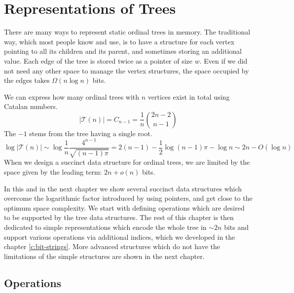 \chapter{Representations of Trees}

There are many ways to represent static ordinal trees in memory.
The traditional way, which most people know and use, is to have a structure for each vertex pointing to all its children and its parent, and sometimes storing an additional value.
Each edge of the tree is stored twice as a pointer of size $w$.
Even if we did not need any other space to manage the vertex structures, the space occupied by the edges takes $\Omega (n \log n)$ bits.

We can express how many ordinal trees with $n$ vertices exist in total using Catalan numbers.
$$ | \mathcal{T}(n) | = C_{n-1} = \frac{1}{n} {2n - 2 \choose n - 1} $$
The $-1$ stems from the tree having a single root.
$$ \log | \mathcal{T}(n) | \sim \log \frac{1}{n}\frac{4^{n-1}}{\sqrt{(n-1)\pi}} = 2(n - 1) - \frac{1}{2} \log{(n - 1)\pi} - \log n \sim 2n - O(\log n) $$
When we design a succinct data structure for ordinal trees, we are limited by the space given by the leading term: $2n + o(n)$ bits.

In this and in the next chapter we show several succinct data structures which overcome the logarithmic factor introduced by using pointers, and get close to the optimum space complexity.
We start with defining operations which are desired to be supported by the tree data structures.
The rest of this chapter is then dedicated to simple representations which encode the whole tree in $\sim 2n$ bits and support various operations via additional indices, which we developed in the chapter \ref{c:bit-strings}.
More advanced structures which do not have the limitations of the simple structures are shown in the next chapter.

\section{Operations}

